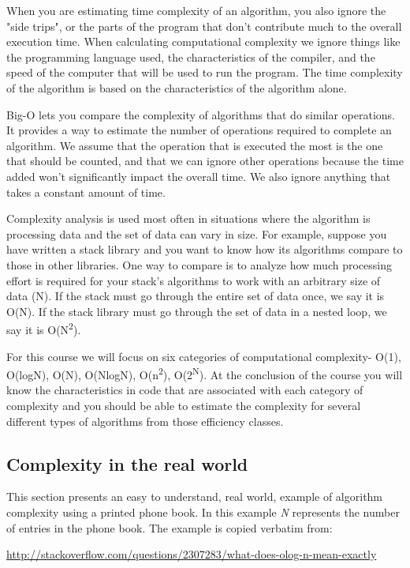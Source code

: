 When you are estimating time complexity of an algorithm, you also ignore the
"side trips", or the parts of the program that don't contribute much to the overall execution time.
When calculating computational complexity we ignore things like the programming language used, the characteristics of the compiler, and the
speed of the computer that will be used to run the program. The time
complexity of the algorithm is based on the characteristics of the
algorithm alone.

Big-O lets you compare the complexity of algorithms that do similar
operations. It provides a way to estimate the number of operations
required to complete an algorithm. We assume that the operation that
is executed the most is the one that should be counted, and that we can
ignore other operations because the time added won't significantly impact
the overall time. We also ignore anything that takes a constant amount
of time.


Complexity analysis is used most often in situations where the algorithm
is processing data and the set of data can vary in size.  For example,
suppose you have written a stack library and you want to know how its algorithms
compare to those in other libraries.  One way to compare is to analyze how much
processing effort is required for your stack's algorithms to work with an
arbitrary size of data (N). If the stack must go through the entire set
of data once, we say it is O(N).  If the stack library must go through
the set of data in a nested loop, we say it is O(N\textsuperscript{2}).

For this course we will focus on six categories of computational
complexity- O(1), O(logN), O(N), O(NlogN), O(n\textsuperscript{2}), O(2\textsuperscript{N}).  At the
conclusion of the course you will know the characteristics in code that
are associated with each category of complexity and you should be able
to estimate the complexity for several different types of  algorithms from those efficiency classes.


\subsection{Complexity in the real world}

This section presents an easy to understand, real world,  example of algorithm
complexity using a printed phone book.  In this example \textit{N} represents
the number of entries in the phone book.  The example is copied verbatim from:


\url{http://stackoverflow.com/questions/2307283/what-does-olog-n-mean-exactly}

